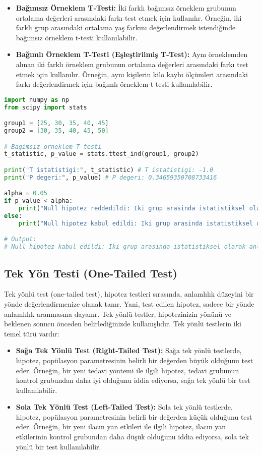 \begin{itemize}
    \item \textbf{Bağımsız Örneklem T-Testi:} İki farklı bağımsız örneklem grubunun ortalama değerleri arasındaki farkı test etmek için kullanılır. Örneğin, iki farklı grup arasındaki ortalama yaş farkını değerlendirmek istendiğinde bağımsız örneklem t-testi kullanılabilir.
    \item \textbf{Bağımlı Örneklem T-Testi (Eşleştirilmiş T-Test):} Aynı örneklemden alınan iki farklı örneklem grubunun ortalama değerleri arasındaki farkı test etmek için kullanılır. Örneğin, aynı kişilerin kilo kaybı ölçümleri arasındaki farkı değerlendirmek için bağımlı örneklem t-testi kullanılabilir.
\end{itemize}

\begin{lstlisting}[language=Python]
import numpy as np
from scipy import stats

group1 = [25, 30, 35, 40, 45]
group2 = [30, 35, 40, 45, 50]

# Bagimsiz orneklem T-testi
t_statistic, p_value = stats.ttest_ind(group1, group2)

print("T istatistigi:", t_statistic) # T istatistigi: -1.0
print("P degeri:", p_value) # P degeri: 0.34659350708733416

alpha = 0.05
if p_value < alpha:
    print("Null hipotez reddedildi: Iki grup arasinda istatistiksel olarak anlamli bir fark vardir.")
else:
    print("Null hipotez kabul edildi: Iki grup arasinda istatistiksel olarak anlamli bir fark yoktur.")

# Output:
# Null hipotez kabul edildi: Iki grup arasinda istatistiksel olarak anlamli bir fark yoktur.
\end{lstlisting}

\subsection{Tek Yön Testi (One-Tailed Test)}
Tek yönlü test (one-tailed test), hipotez testleri sırasında, anlamlılık düzeyini bir yönde değerlendirmenize olanak tanır. Yani, test edilen hipotez, sadece bir yönde anlamlılık aranmasına dayanır. Tek yönlü testler, hipotezinizin yönünü ve beklenen sonucu önceden belirlediğinizde kullanışlıdır. Tek yönlü testlerin iki temel türü vardır:

\begin{itemize}
    \item \textbf{Sağa Tek Yönlü Test (Right-Tailed Test):} Sağa tek yönlü testlerde, hipotez, popülasyon parametresinin belirli bir değerden büyük olduğunu test eder. Örneğin, bir yeni tedavi yöntemi ile ilgili hipotez, tedavi grubunun kontrol grubundan daha iyi olduğunu iddia ediyorsa, sağa tek yönlü bir test kullanılabilir.
    \item \textbf{Sola Tek Yönlü Test (Left-Tailed Test):} Sola tek yönlü testlerde, hipotez, popülasyon parametresinin belirli bir değerden küçük olduğunu test eder. Örneğin, bir yeni ilacın yan etkileri ile ilgili hipotez, ilacın yan etkilerinin kontrol grubundan daha düşük olduğunu iddia ediyorsa, sola tek yönlü bir test kullanılabilir.
\end{itemize}


